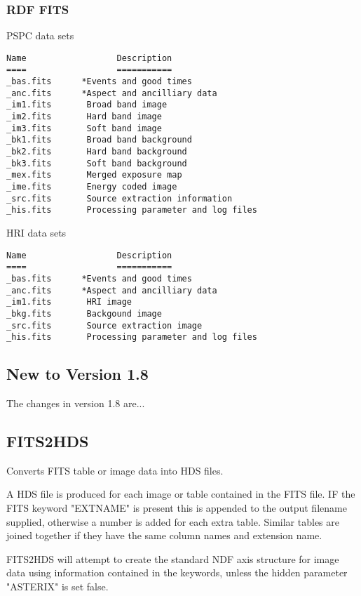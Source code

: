 \documentclass{book}
\renewcommand{\_}{{\tt\char'137}}     %
\begin{document}
\subsubsection{RDF FITS}
PSPC data sets
\begin{verbatim}
Name                  Description
====                  ===========
_bas.fits      *Events and good times
_anc.fits      *Aspect and ancilliary data
_im1.fits       Broad band image
_im2.fits       Hard band image
_im3.fits       Soft band image
_bk1.fits       Broad band background
_bk2.fits       Hard band background
_bk3.fits       Soft band background
_mex.fits       Merged exposure map
_ime.fits       Energy coded image
_src.fits       Source extraction information
_his.fits       Processing parameter and log files
\end{verbatim}
HRI data sets
\begin{verbatim}
Name                  Description
====                  ===========
_bas.fits      *Events and good times
_anc.fits      *Aspect and ancilliary data
_im1.fits       HRI image
_bkg.fits       Backgound image
_src.fits       Source extraction image
_his.fits       Processing parameter and log files
\end{verbatim}
\subsection{New to Version 1.8}
The changes in version 1.8 are...
\subsection{FITS2HDS}
Converts FITS table or image data into HDS files.
 
A HDS file is produced for each image or table contained in the
FITS file. IF the FITS keyword "EXTNAME" is present this is
appended to the output filename supplied, otherwise a number is
added for each extra table. Similar tables are joined together
if they have the same column names and extension name.
 
FITS2HDS will attempt to create the standard NDF axis structure
for image data using information contained in the keywords, unless
the hidden parameter "ASTERIX" is set false.
 
\end{document}
